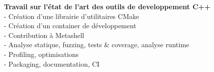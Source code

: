 \documentclass[a4paper]{article}
\begin{document}
{\begin{minipage}[t]{0.6\paperwidth}
{\begin{minipage}[H]{0.58\paperwidth}
{		\hspace{1cm} \textbf{Travail sur l'état de l'art des outils de developpement C++}\\
		\hspace{2cm} - Création d'une librairie d'utilitaires CMake\\
		\hspace{2cm} - Création d'un container de développement\\
		\hspace{2cm} - Contribution à Metashell\\
		\hspace{2cm} - Analyse statique, fuzzing, tests \& coverage, analyse runtime\\
		\hspace{2cm} - Profiling, optimisations\\
		\hspace{2cm} - Packaging, documentation, CI\\
		}
		\end{minipage}\if{}} \fi


\end{minipage}}
\end{document}
